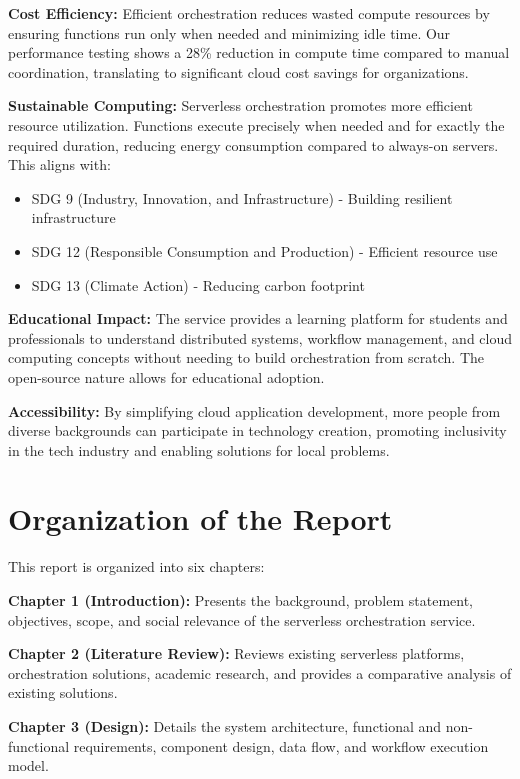 \documentclass{fisatprojectfinal}
\begin{document}
\textbf{Cost Efficiency:} Efficient orchestration reduces wasted compute resources by ensuring functions run only when needed and minimizing idle time. Our performance testing shows a 28\% reduction in compute time compared to manual coordination, translating to significant cloud cost savings for organizations.

\textbf{Sustainable Computing:} Serverless orchestration promotes more efficient resource utilization. Functions execute precisely when needed and for exactly the required duration, reducing energy consumption compared to always-on servers. This aligns with:
\begin{itemize}
    \item SDG 9 (Industry, Innovation, and Infrastructure) - Building resilient infrastructure
    \item SDG 12 (Responsible Consumption and Production) - Efficient resource use
    \item SDG 13 (Climate Action) - Reducing carbon footprint
\end{itemize}

\textbf{Educational Impact:} The service provides a learning platform for students and professionals to understand distributed systems, workflow management, and cloud computing concepts without needing to build orchestration from scratch. The open-source nature allows for educational adoption.

\textbf{Accessibility:} By simplifying cloud application development, more people from diverse backgrounds can participate in technology creation, promoting inclusivity in the tech industry and enabling solutions for local problems.

\section{Organization of the Report}
This report is organized into six chapters:

\textbf{Chapter 1 (Introduction):} Presents the background, problem statement, objectives, scope, and social relevance of the serverless orchestration service.

\textbf{Chapter 2 (Literature Review):} Reviews existing serverless platforms, orchestration solutions, academic research, and provides a comparative analysis of existing solutions.

\textbf{Chapter 3 (Design):} Details the system architecture, functional and non-functional requirements, component design, data flow, and workflow execution model.
\end{document}

